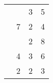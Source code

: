 \documentclass[a4paper,12pt]{article}
\begin{document}
\begin{center}
\begin{tabular}{c|c|cc}
&&3&5\\
&7&2&4\\
&&2&8\\
&4&3&6\\ \hline
\antwortzeile 1&2&2&3 \\ \hline
\end{tabular}
\end{center}
\end{document}
